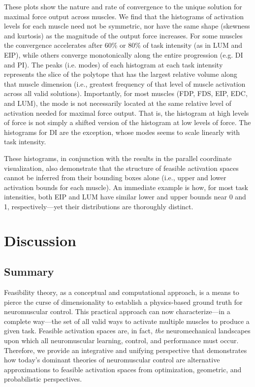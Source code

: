 \documentclass[9pt,twocolumn,twoside,lineno]{pnas-new}
\begin{document}
These plots show the nature and rate of convergence to the unique solution for maximal force output across muscles.
We find that the histograms of activation levels for each muscle need not be symmetric, nor have the same shape (skewness and kurtosis) as the magnitude of the output force increases.
For some muscles the convergence accelerates after 60\% or 80\% of task intensity (as in LUM and EIP), while others converge monotonically along the entire progression (e.g. DI and PI).
The peaks (i.e. modes) of each histogram at each task intensity represents the slice of the polytope that has the largest relative volume along that muscle dimension (i.e., greatest frequency of that level of muscle activation across all valid solutions). Importantly, for most muscles (FDP, FDS, EIP, EDC, and LUM), the mode is not necessarily located at the same relative level of activation needed for maximal force output. That is, the histogram at high levels of force is not simply a shifted version of the histogram at low levels of force. The histograms for DI are the exception, whose modes seems to scale linearly with task intensity.

These histograms, in conjunction with the results in the parallel coordinate visualization, also demonstrate that the structure of feasible activation spaces cannot be inferred from their bounding boxes alone (i.e., upper and lower activation bounds for each muscle).
An immediate example is how, for most task intensities, both EIP and LUM have similar lower and upper bounds near 0 and 1, respectively---yet their distributions are thoroughly distinct.

\section*{Discussion}
\subsection*{Summary}

Feasibility theory, as a conceptual and computational approach, is a means to pierce the curse of dimensionality to establish a physics-based ground truth for neuromuscular control. This practical approach can now characterize---in a complete way---the set of all valid ways to activate multiple muscles to produce a given task.
Feasible activation spaces are, in fact, \emph{the} neuromechanical landscapes upon which all neuromuscular learning, control, and performance must occur. Therefore, we provide an integrative and unifying perspective that demonstrates how today's dominant theories of neuromuscular control are alternative approximations to feasible activation spaces from optimization, geometric, and probabilistic perspectives.
\end{document}
